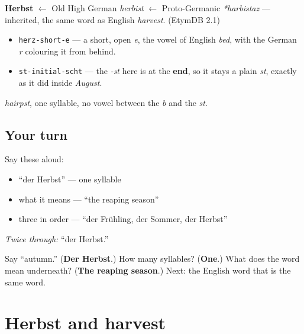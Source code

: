 \begin{cousinweb}
\textbf{Herbst} $\leftarrow$ Old High German \emph{herbist} $\leftarrow$ Proto-Germanic \emph{*harbistaz} — inherited, the same word as English \emph{harvest}. (EtymDB 2.1)
\end{cousinweb}

\begin{sounds}
\begin{itemize}
\raggedright
  \item \texttt{herz-short-e} — a short, open \emph{e}, the vowel of English \emph{bed}, with the German \emph{r} colouring it from behind.
  \item \texttt{st-initial-scht} — the \emph{-st} here is at the \textbf{end}, so it stays a plain \emph{st}, exactly as it did inside \emph{August}.
\end{itemize}

\emph{hairpst}, one syllable, no vowel between the \emph{b} and the \emph{st}.
\end{sounds}

\subsection*{Your turn}
Say these aloud:

\begin{itemize}
\raggedright
  \item \textquotedblleft{}der Herbst\textquotedblright{} — one syllable
  \item what it means — \textquotedblleft{}the reaping season\textquotedblright{}
  \item three in order — \textquotedblleft{}der Frühling, der Sommer, der Herbst\textquotedblright{}
\end{itemize}

\emph{Twice through:} \textquotedblleft{}der Herbst.\textquotedblright{}

\begin{tcolorbox}[breakable,colback=teal!4,colframe=teal!35!black,title={Before you move on}]
Say \textquotedblleft{}autumn.\textquotedblright{} (\textbf{Der Herbst}.) How many syllables? (\textbf{One}.) What does the word mean underneath? (\textbf{The reaping season}.) Next: the English word that is the same word.
\end{tcolorbox}
\section[Herbst und harvest]{Herbst and harvest}

